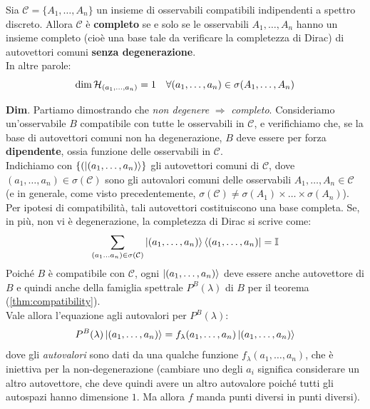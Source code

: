 \documentclass[../../FisicaTeorica.tex]{subfiles}
\begin{document}
\begin{thm}
Sia $\mathcal{C}=\{A_1, \dots, A_n\}$ un insieme di osservabili compatibili indipendenti a spettro discreto. Allora $\mathcal{C}$ è \textbf{completo} se e solo se le osservabili $A_1, \dots, A_n$ hanno un insieme completo (cioè una base tale da verificare la completezza di Dirac) di autovettori comuni \textbf{senza degenerazione}.\\
In altre parole:
\[
\dim \mathcal{H}_{(a_1,\dots,a_n)}=1\quad \forall (a_1,\dots,a_n)\in \sigma(A_1,\dots,A_n)
\]
\end{thm} 
\textbf{Dim}. Partiamo dimostrando che \textit{non degenere} $\Rightarrow$ \textit{completo}.         
Consideriamo un'osservabile $B$ compatibile con tutte le osservabili in $\mathcal{C}$, e verifichiamo che, se la base di autovettori comuni non ha degenerazione, $B$ deve essere per forza \textbf{dipendente}, ossia funzione delle osservabili in $\mathcal{C}$.\\
Indichiamo con $\{(\ket{(a_1,\dots, a_n)}\}$ gli autovettori comuni di $\mathcal{C}$, dove $(a_1, \dots, a_n)\in\sigma(\mathcal{C})$ sono gli autovalori comuni delle osservabili $A_1, \dots, A_n \in \mathcal{C}$ (e in generale, come visto precedentemente, $\sigma(\mathcal{C})\neq \sigma(A_1)\times \dots \times \sigma(A_n)$).\\
Per ipotesi di compatibilità, tali autovettori costituiscono una base completa. Se, in più, non vi è degenerazione, la completezza di Dirac si scrive come:
\begin{equation}
\sum_{(a_1 \dots a_n)\in \sigma(\mathcal{C})} \ket{(a_1, \dots, a_n)}\bra{(a_1, \dots, a_n)}=\mathbb{I}
\label{eqn:completezza_base_comune}
\end{equation}
Poiché $B$ è compatibile con $\mathcal{C}$, ogni $\ket{(a_1, \dots, a_n)}$ deve essere anche autovettore di $B$ e quindi anche della famiglia spettrale $P^B(\lambda)$  di $B$ per il teorema (\ref{thm:compatibility}).\\
Vale allora l'equazione agli autovalori per $P^B(\lambda)$:
\begin{equation}
P^B(\lambda)\ket{(a_1, \dots, a_n)}=f_\lambda(a_1, \dots, a_n) \ket{(a_1, \dots, a_n)}
\label{eqn:proiettori_base_comune}
\end{equation}
dove gli \textit{autovalori} sono dati da una qualche funzione $f_\lambda(a_1,\dots, a_n)$, che è iniettiva per la non-degenerazione (cambiare uno degli $a_i$ significa considerare un altro autovettore, che deve quindi avere un altro autovalore poiché tutti gli autospazi hanno dimensione $1$. Ma allora $f$ manda punti diversi in punti diversi).\\
\end{document}
